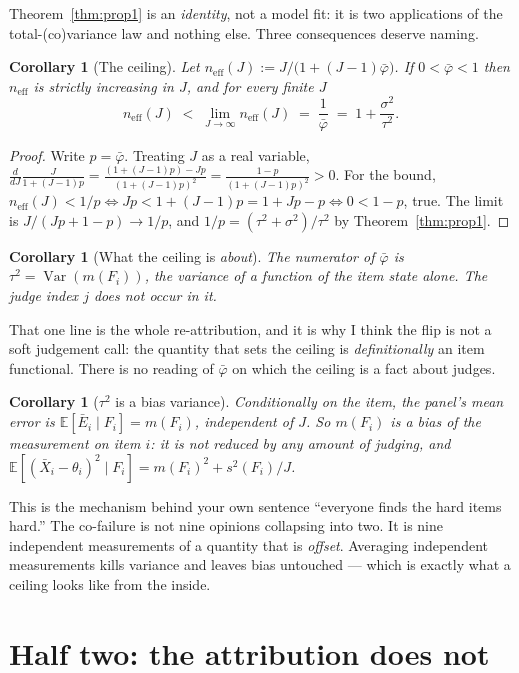 \documentclass[11pt]{article}
\theoremstyle{plain}
\newtheorem{corollary}[theorem]{Corollary}
\theoremstyle{definition}
\theoremstyle{remark}
\newcommand{\Var}{\operatorname{Var}}
\newcommand{\E}{\mathbb{E}}
\newcommand{\pb}{\bar{\varphi}}
\newcommand{\neff}{n_{\mathrm{eff}}}
\begin{document}
Theorem~\ref{thm:prop1} is an \emph{identity}, not a model fit: it is two applications of the
total-(co)variance law and nothing else. Three consequences deserve naming.

\begin{corollary}[The ceiling]\label{cor:ceiling}
Let $\neff(J):=J/\big(1+(J-1)\pb\big)$. If $0<\pb<1$ then $\neff$ is strictly increasing in $J$,
and for every finite $J$
\[
\neff(J)\;<\;\lim_{J\to\infty}\neff(J)\;=\;\frac{1}{\pb}\;=\;1+\frac{\sigma^2}{\tau^2}.
\]
\end{corollary}

\begin{proof}
Write $p=\pb$. Treating $J$ as a real variable,
$\frac{d}{dJ}\frac{J}{1+(J-1)p}=\frac{(1+(J-1)p)-Jp}{(1+(J-1)p)^2}=\frac{1-p}{(1+(J-1)p)^2}>0$.
For the bound, $\neff(J)<1/p \iff Jp<1+(J-1)p=1+Jp-p \iff 0<1-p$, true. The limit is
$J/(Jp+1-p)\to 1/p$, and $1/p=(\tau^2+\sigma^2)/\tau^2$ by Theorem~\ref{thm:prop1}.
\end{proof}

\begin{corollary}[What the ceiling is \emph{about}]\label{cor:what}
The numerator of $\pb$ is $\tau^2=\Var(m(F_i))$, the variance of a function of the item state
alone. The judge index $j$ does not occur in it.
\end{corollary}

That one line is the whole re-attribution, and it is why I think the flip is not a soft
judgement call: the quantity that sets the ceiling is \emph{definitionally} an item functional.
There is no reading of $\pb$ on which the ceiling is a fact about judges.

\begin{corollary}[$\tau^2$ is a bias variance]\label{cor:bias}
Conditionally on the item, the panel's mean error is
$\E[\bar E_i\mid F_i]=m(F_i)$, independent of $J$. So $m(F_i)$ is a \emph{bias} of the
measurement on item $i$: it is not reduced by any amount of judging, and
$\E[(\bar X_i-\theta_i)^2\mid F_i]=m(F_i)^2+s^2(F_i)/J$.
\end{corollary}

This is the mechanism behind your own sentence ``everyone finds the hard items hard.'' The
co-failure is not nine opinions collapsing into two. It is nine independent measurements of a
quantity that is \emph{offset}. Averaging independent measurements kills variance and leaves bias
untouched --- which is exactly what a ceiling looks like from the inside.

\section{Half two: the attribution does not}
\end{document}
